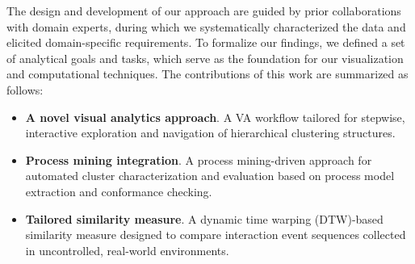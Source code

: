 \documentclass[preprint,journal]{vgtc}            %
\begin{document}
The design and development of our approach are guided by prior collaborations with domain experts, during which we systematically characterized the data and elicited domain-specific requirements.
To formalize our findings, we defined a set of analytical goals and tasks, which serve as the foundation for our visualization and computational techniques. 
The contributions of this work are summarized as follows:
\begin{itemize}[itemsep=-3pt,topsep=1pt]


  
    \item \textbf{A novel visual analytics approach}. 
    A VA workflow tailored for stepwise, interactive exploration and navigation of hierarchical clustering structures. %

    \item \textbf{Process mining integration}. A process mining-driven approach for automated cluster characterization and evaluation based on process model extraction and conformance checking.

    \item \textbf{Tailored similarity measure}. A dynamic time warping (DTW)-based similarity measure designed to compare interaction event sequences collected in uncontrolled, real-world environments.
    

\end{itemize}
\end{document}

